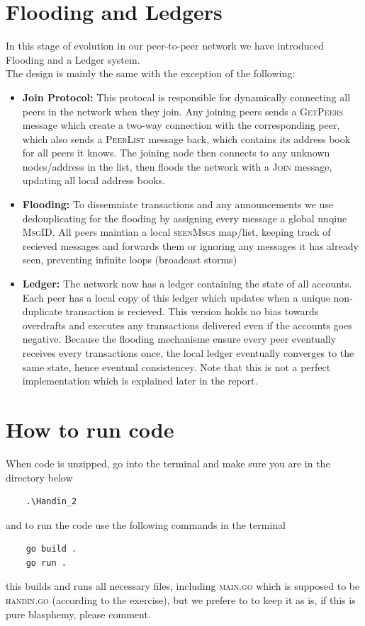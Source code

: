 \documentclass[12pt]{article}
\begin{document}
\section*{Flooding and Ledgers}
In this stage of evolution in our peer-to-peer network we have introduced Flooding and a Ledger system.\\
The design is mainly the same with the exception of the following:
\begin{itemize}
    \item \textbf{Join Protocol:} This protocal is responsible for dynamically connecting all peers in the network when they join. Any joining peers sends a \textsc{GetPeers} message which create a two-way connection with the corresponding peer, which also sends a \textsc{PeerList} message back, which contains its address book for all peers it knows. The joining node then connects to any unknown nodes/address in the list, then floods the network with a \textsc{Join} message, updating all local address books.
    \item \textbf{Flooding:} To dissemniate transactions and any announcements we use dedouplicating for the flooding by assigning every message a global unqiue \textsc{MsgID}. All peers maintian a local \textsc{seenMsgs} map/list, keeping track of recieved messages and forwards them or ignoring any messages it has already seen, preventing infinite loops (broadcast storms)
    \item \textbf{Ledger:} The network now has a ledger containing the state of all accounts. Each peer has a local copy of this ledger which updates when a unique non-duplicate transaction is recieved. This version holds no bias towards overdrafts and executes any transactions delivered even if the accounts goes negative. Because the flooding mechanisme ensure every peer eventually receives every transactions once, the local ledger eventually converges to the same state, hence eventual consistencey. Note that this is not a perfect implementation which is explained later in the report.
\end{itemize}
\section*{How to run code}
When code is unzipped, go into the terminal and make sure you are in the directory below
\begin{lstlisting}
    .\Handin_2
\end{lstlisting}
and to run the code use the following commands in the terminal
\begin{lstlisting}
    go build .
    go run .
\end{lstlisting}
this builds and runs all necessary files, including \textsc{main.go} which is supposed to be \textsc{handin.go} (according to the exercise), but we prefere to to keep it as is, if this is pure blasphemy, please comment.
\end{document}
